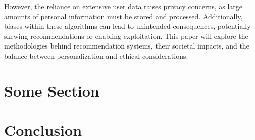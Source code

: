 \documentclass[10pt,twocolumn,twoside,a4paper]{report}
\begin{document}
However, the reliance on extensive user data raises privacy concerns, as large amounts of personal information must
be stored and processed. Additionally, biases within these algorithms can lead to unintended consequences, potentially
skewing recommendations or enabling exploitation. This paper will explore the methodologies behind recommendation systems,
their societal impacts, and the balance between personalization and ethical considerations.

\section{Some Section} \label{some_section}

\section{Conclusion} \label{conclusion}


\nocite{*}

\end{document}
